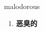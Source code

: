 
\begin{frame}
{\huge malodorous}
\begin{center}
\begin{enumerate}\Large
  \item \textbf{恶臭的}
\end{enumerate}
\end{center}
\end{frame}
